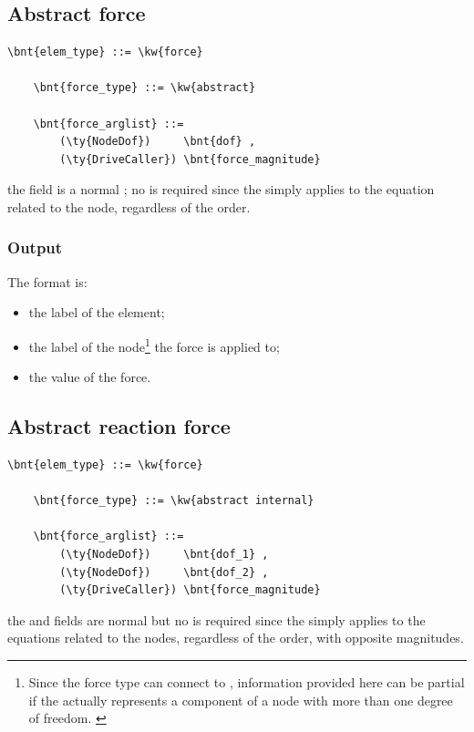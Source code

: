\subsection{Abstract force}\label{sec:EL:FORCE:ABSTRACT}
\begin{Verbatim}[commandchars=\\\{\}]
    \bnt{elem_type} ::= \kw{force}

    \bnt{force_type} ::= \kw{abstract}

    \bnt{force_arglist} ::=
        (\ty{NodeDof})     \bnt{dof} ,
        (\ty{DriveCaller}) \bnt{force_magnitude}
\end{Verbatim}
the  field is a normal ; no  is required
since the  simply applies to the equation related to the node,
regardless of the order.

\subsubsection{Output}
The format is:
\begin{itemize}
    \item the label of the element;
    \item the label of the node\footnote{Since the  force type
	can connect to , information provided here
	can be partial if the  actually represents
	a component of a node with more than one degree of freedom.
	\label{footnote:EL:FORCE:ABSTRACT:OUTPUT:node_dof}}
	the force is applied to;
    \item the value of the force.
\end{itemize}

\subsection{Abstract reaction force}
\begin{Verbatim}[commandchars=\\\{\}]
    \bnt{elem_type} ::= \kw{force}

    \bnt{force_type} ::= \kw{abstract internal}

    \bnt{force_arglist} ::=
        (\ty{NodeDof})     \bnt{dof_1} ,
        (\ty{NodeDof})     \bnt{dof_2} ,
        (\ty{DriveCaller}) \bnt{force_magnitude}
\end{Verbatim}
the  and  fields are normal 
but no  is required since the  simply applies
to the equations related to the nodes, regardless of the order, with
opposite magnitudes.


